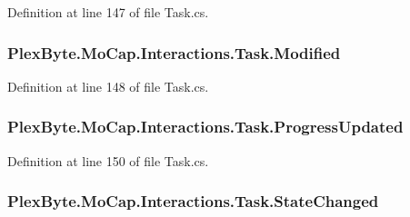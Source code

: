 Definition at line 147 of file Task.\+cs.

\subsubsection[{\texorpdfstring{Modified}{Modified}}]{ Plex\+Byte.\+Mo\+Cap.\+Interactions.\+Task.\+Modified}\hypertarget{class_plex_byte_1_1_mo_cap_1_1_interactions_1_1_task_a84fdfe29a8cd9889cd2eb0d2216d01d1}{}\label{class_plex_byte_1_1_mo_cap_1_1_interactions_1_1_task_a84fdfe29a8cd9889cd2eb0d2216d01d1}


Definition at line 148 of file Task.\+cs.

\subsubsection[{\texorpdfstring{Progress\+Updated}{ProgressUpdated}}]{ Plex\+Byte.\+Mo\+Cap.\+Interactions.\+Task.\+Progress\+Updated}\hypertarget{class_plex_byte_1_1_mo_cap_1_1_interactions_1_1_task_a018dbc01193478565a41d56409618e9a}{}\label{class_plex_byte_1_1_mo_cap_1_1_interactions_1_1_task_a018dbc01193478565a41d56409618e9a}


Definition at line 150 of file Task.\+cs.

\subsubsection[{\texorpdfstring{State\+Changed}{StateChanged}}]{ Plex\+Byte.\+Mo\+Cap.\+Interactions.\+Task.\+State\+Changed}\hypertarget{class_plex_byte_1_1_mo_cap_1_1_interactions_1_1_task_ad95c06276af6eb715b37421f1a121cc8}{}\label{class_plex_byte_1_1_mo_cap_1_1_interactions_1_1_task_ad95c06276af6eb715b37421f1a121cc8}


